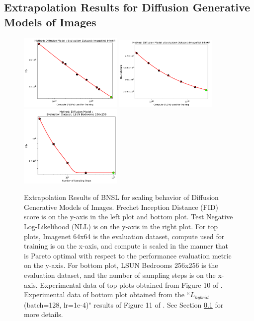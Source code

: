 \documentclass{article} %
\begin{document}
\subsection{Extrapolation Results for Diffusion Generative Models of Images}
\label{section:diffusion}

\vspace{-3.3mm}

\begin{figure}[htbp]
    \centering
\includegraphics[width=0.44\textwidth]{figures/diffusion/diffusion__fid.png}
\includegraphics[width=0.44\textwidth]{figures/diffusion/diffusion__nll.png}
\includegraphics[width=0.44\textwidth]{figures/diffusion/diffusion__number_of_sampling_steps.png}

\vspace{-3.3mm}

    \caption{
Extrapolation Results of BNSL for scaling behavior of Diffusion Generative Models of Images. Frechet Inception Distance (FID) score is on the y-axis in the left plot and bottom plot. Test Negative Log-Likelihood (NLL) is on the y-axis in the right plot. For top plots, Imagenet 64x64 is the evaluation dataset, compute used for training is on the x-axis, and compute is scaled in the manner that is Pareto optimal with respect to the performance evaluation metric on the y-axis. For bottom plot, LSUN Bedrooms 256x256 is the evaluation dataset, and the number of sampling steps is on the x-axis. Experimental data of top plots obtained from Figure 10 of \cite{nichol2021improved}. Experimental data of bottom plot obtained from the ``$L_{hybrid}$ (batch=128, lr=1e-4)" results of Figure 11 of \cite{nichol2021improved}. See Section \ref{section:diffusion} for more details.
    }
    \label{fig:diffusion_compute_scaling}
\end{figure}
\end{document}
